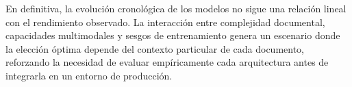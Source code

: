 En definitiva, la evolución cronológica de los modelos no sigue una relación lineal con el rendimiento observado. La interacción entre complejidad documental, capacidades multimodales y sesgos de entrenamiento genera un escenario donde la elección óptima depende del contexto particular de cada documento, reforzando la necesidad de evaluar empíricamente cada arquitectura antes de integrarla en un entorno de producción.









    

